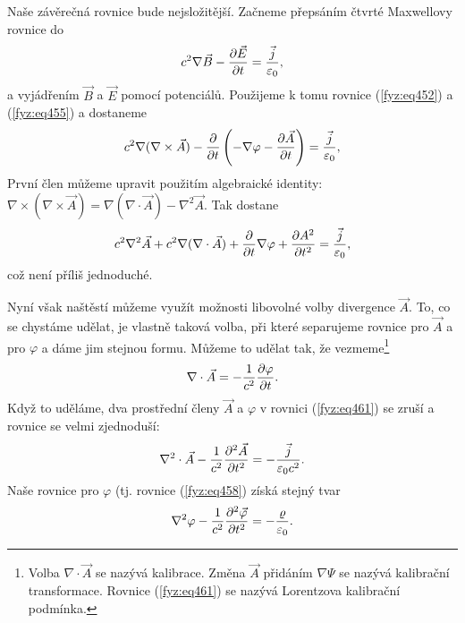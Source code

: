 {  Naše závěrečná rovnice bude nejsložitější. Začneme přepsáním čtvrté Maxwellovy rovnice do
  \begin{equation}\label{fyz:eq459}
    c^2\nabla\vec{B} - \dfrac{\partial \vec{E}}{\partial t} = \frac{\vec{j}}{\varepsilon_0},
  \end{equation}
  a vyjádřením \(\vec{B}\) a \(\vec{E}\) pomocí potenciálů. Použijeme k tomu rovnice 
  (\ref{fyz:eq452}) a (\ref{fyz:eq455}) a dostaneme
  \begin{equation}\label{fyz:eq460}
    c^2\nabla(\nabla\times\vec{A}) - \dfrac{\partial  }{\partial t}\left(- \nabla\varphi - \dfrac{\partial \vec{A}}{\partial t}\right) 
      = \frac{\vec{j}}{\varepsilon_0},
  \end{equation}
  První člen můžeme upravit použitím algebraické identity: \(\nabla\times(\nabla\times\vec{A}) = 
  \nabla(\nabla\cdot\vec{A})- \nabla^2\vec{A}\). Tak dostane
  \begin{equation}\label{fyz:eq461}
    c^2\nabla^2\vec{A} + c^2\nabla(\nabla\cdot\vec{A}) + \dfrac{\partial  }{\partial t}\nabla\varphi + 
    \dfrac{\partial A^2}{\partial t^2}  = \frac{\vec{j}}{\varepsilon_0},
  \end{equation}
  což není příliš jednoduché.
  
  Nyní však naštěstí můžeme využít možnosti libovolné volby divergence \(\vec{A}\). To, co se 
  chystáme udělat, je vlastně taková volba, při které separujeme rovnice pro \(\vec{A}\) a pro 
  \(\varphi\) a dáme jim stejnou formu. Můžeme to udělat tak, že vezmeme\footnote{Volba 
  \(\nabla\cdot\vec{A}\) se nazývá kalibrace. Změna \(\vec{A}\) přidáním \(\nabla\Psi\) se nazývá 
  kalibrační transformace. Rovnice (\ref{fyz:eq461}) se nazývá Lorentzova kalibrační podmínka.}
  \begin{equation}\label{fyz:eq462}
    \nabla\cdot\vec{A} = -\frac{1}{c^2}\dfrac{\partial \varphi}{\partial t}.
  \end{equation}
  Když to uděláme, dva prostřední členy \(\vec{A}\) a \(\varphi\) v rovnici (\ref{fyz:eq461}) se 
  zruší a rovnice se velmi zjednoduší: 
  \begin{equation}\label{fyz:eq463}
    \nabla^2\cdot\vec{A} - \frac{1}{c^2}\dfrac{\partial^2 \vec{A}}{\partial t^2} = - \frac{\vec{j}}{\varepsilon_0c^2}.
  \end{equation} 
  Naše rovnice pro \(\varphi\) (tj. rovnice (\ref{fyz:eq458}) získá stejný tvar
  \begin{equation}\label{fyz:eq464}
    \nabla^2\varphi - \frac{1}{c^2}\dfrac{\partial^2 \vec{\varphi}}{\partial t^2} = - \frac{\varrho}{\varepsilon_0}.
  \end{equation} 

}

